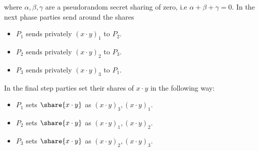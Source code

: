 \noindent where $\alpha, \beta, \gamma$ are a pseudorandom secret sharing of
zero, i.e $\alpha + \beta + \gamma = 0$. In the next phase parties send
around the shares

\begin{itemize}
    \item $P_1$ sends privately $(x \cdot y)_1$ to $P_2$.
    \item $P_2$ sends privately $(x \cdot y)_2$ to $P_3$.
    \item $P_3$ sends privately $(x \cdot y)_3$ to $P_1$.
\end{itemize}

\noindent In the final step parties set their shares of $x \cdot y$ in the following way:
\begin{itemize}
    \item $P_1$ sets $\share{x \cdot y}$ as $(x\cdot y)_3, (x \cdot y)_1$.
    \item $P_2$ sets $\share{x \cdot y}$ as $(x\cdot y)_1, (x \cdot y)_2$.
    \item $P_3$ sets $\share{x \cdot y}$ as $(x\cdot y)_2, (x \cdot y)_3$.
\end{itemize}

